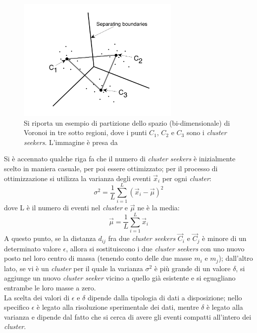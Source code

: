 \begin{figure}[h!]
	\centering
	\includegraphics[width=0.70\textwidth]{figs/Voronoi.png}
	\caption{Si riporta un esempio di partizione dello spazio (bi-dimensionale) di Voronoi in tre sotto regioni, dove i punti $C_1$, $C_2$ e $C_3$ sono i \textit{cluster seekers}. L'immagine è presa da \cite{IntroML}}
	\label{Voronoi}
\end{figure}

Si è accennato qualche riga fa che il numero di \textit{cluster seekers} è inizialmente scelto in maniera casuale, per poi essere ottimizzato; per il processo di ottimizzazione si utilizza la varianza degli eventi $\vec{x}_i$ per ogni \textit{cluster}:
\begin{equation}
\sigma^2 = \frac{1}{L}\sum_{i=1}^{L} (\vec{x}_i - \vec{\mu})^2
\end{equation}
dove L è il numero di eventi nel \textit{cluster} e $\vec{\mu}$ ne è la media:
\begin{equation}
\vec{\mu} = \frac{1}{L}\sum_{i=1}^{L} \vec{x}_i
\end{equation}
A questo punto, se la distanza $d_{ij}$ fra due \textit{cluster seekers} $\vec{C}_i$ e $\vec{C}_j$ è minore di un determinato valore $\epsilon$, allora si sostituiscono i due \textit{cluster seekers} con uno nuovo posto nel loro centro di massa (tenendo conto delle due masse $m_i$ e $m_j$); dall'altro lato, se vi è un \textit{cluster} per il quale la varianza $\sigma^2$ è più grande di un valore $\delta$, si aggiunge un nuovo \textit{cluster seeker} vicino a quello già esistente e si eguagliano entrambe le loro masse a zero.\\
La scelta dei valori di $\epsilon$ e $\delta$ dipende dalla tipologia di dati a disposizione; nello specifico $\epsilon$ è legato alla risoluzione sperimentale dei dati, mentre $\delta$ è legato alla varianza e dipende dal fatto che si cerca di avere gli eventi compatti all'intero dei \textit{cluster}.


